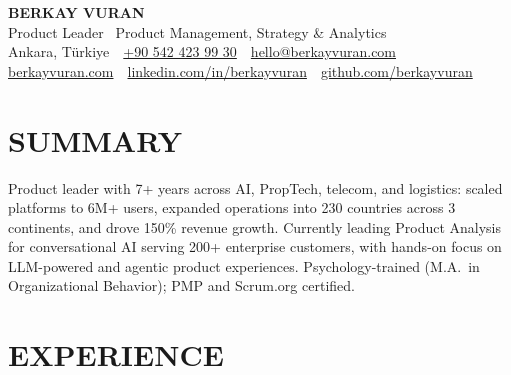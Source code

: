 \documentclass[10pt,letterpaper]{article}
\begin{document}
\begin{center}
  {\fontsize{21}{23}\selectfont\bfseries\color{accent}BERKAY VURAN}\\[2pt]
  Product Leader \textbar\ Product Management, Strategy \& Analytics\\[2pt]
  {\small Ankara, Türkiye \,\textbullet\,
  \href{tel:+905424239930}{+90 542 423 99 30} \,\textbullet\,
  \href{mailto:hello@berkayvuran.com}{hello@berkayvuran.com} \,\textbullet\,
  \href{https://berkayvuran.com}{berkayvuran.com} \,\textbullet\,
  \href{https://www.linkedin.com/in/berkayvuran}{linkedin.com/in/berkayvuran} \,\textbullet\,
  \href{https://github.com/berkayvuran}{github.com/berkayvuran}}
\end{center}

\vspace{-3pt}

\section{SUMMARY}
Product leader with 7+ years across AI, PropTech, telecom, and logistics: scaled platforms to 6M+ users, expanded operations into 230 countries across 3 continents, and drove 150\% revenue growth. Currently leading Product Analysis for conversational AI serving 200+ enterprise customers, with hands-on focus on LLM-powered and agentic product experiences. Psychology-trained (M.A.\ in Organizational Behavior); PMP and Scrum.org certified.

\section{EXPERIENCE}
\end{document}
